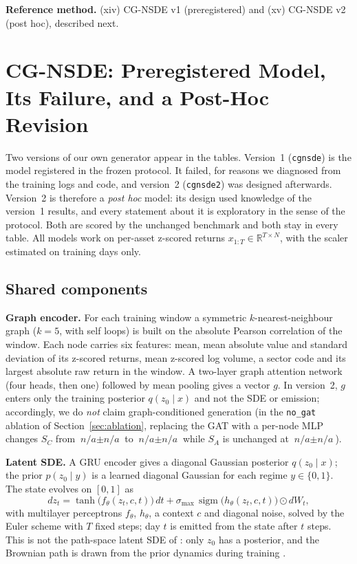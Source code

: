 \documentclass[journal]{IEEEtran}
\newcommand{\pendingnum}{\textit{n/a}}
\providecommand{\scoreCCgnsdeTwoFull}{\pendingnum}
\providecommand{\scoreCCgnsdeTwoFullSd}{\pendingnum}
\providecommand{\scoreCAblNoGat}{\pendingnum}
\providecommand{\scoreCAblNoGatSd}{\pendingnum}
\providecommand{\scoreAAblNoGat}{\pendingnum}
\providecommand{\scoreAAblNoGatSd}{\pendingnum}
\begin{document}
\textbf{Reference method.} (xiv) CG-NSDE v1 (preregistered) and (xv) CG-NSDE v2 (post hoc), described next.

\section{CG-NSDE: Preregistered Model, Its Failure, and a Post-Hoc Revision}
\label{sec:method}
Two versions of our own generator appear in the tables. Version~1 (\texttt{cgnsde}) is the model registered
in the frozen protocol. It failed, for reasons we diagnosed from the training logs and code, and version~2
(\texttt{cgnsde2}) was designed afterwards. Version~2 is therefore a \emph{post hoc} model: its design used
knowledge of the version~1 results, and every statement about it is exploratory in the sense of the protocol.
Both are scored by the unchanged benchmark and both stay in every table. All models work on per-asset z-scored
returns $x_{1:T}\in\mathbb{R}^{T\times N}$, with the scaler estimated on training days only.

\subsection{Shared components}
\textbf{Graph encoder.} For each training window a symmetric $k$-nearest-neighbour graph ($k=5$, with self
loops) is built on the absolute Pearson correlation of the window. Each node carries six features: mean, mean
absolute value and standard deviation of its z-scored returns, mean z-scored log volume, a sector code and its
largest absolute raw return in the window. A two-layer graph attention network \cite{velickovic2018gat} (four
heads, then one) followed by mean pooling gives a vector $g$. In version~2, $g$ enters only the training
posterior $q(z_0\mid x)$ and not the SDE or emission; accordingly, we do \emph{not} claim graph-conditioned
generation (in the \texttt{no\_gat} ablation of Section~\ref{sec:ablation}, replacing the GAT with a per-node
MLP changes $S_C$ from $\scoreCCgnsdeTwoFull \pm \scoreCCgnsdeTwoFullSd$ to $\scoreCAblNoGat \pm
\scoreCAblNoGatSd$ while $S_A$ is unchanged at $\scoreAAblNoGat \pm \scoreAAblNoGatSd$).

\textbf{Latent SDE.} A GRU encoder gives a diagonal Gaussian posterior $q(z_0\mid x)$; the prior
$p(z_0\mid y)$ is a learned diagonal Gaussian for each regime $y\in\{0,1\}$. The state evolves on $[0,1]$ as
\begin{equation}
dz_t = \tanh\!\big(f_\theta(z_t,c,t)\big)\,dt
     + \sigma_{\max}\,\operatorname{sigm}\!\big(h_\theta(z_t,c,t)\big)\odot dW_t ,
\label{eq:sde}
\end{equation}
with multilayer perceptrons $f_\theta$, $h_\theta$, a context $c$ and diagonal noise, solved by the Euler
scheme with $T$ fixed steps; day $t$ is emitted from the state after $t$ steps. This is not the path-space
latent SDE of \cite{li2020scalable}: only $z_0$ has a posterior, and the Brownian path is drawn from the prior
dynamics during training \cite{kidger2021neuralsde}.
\end{document}
